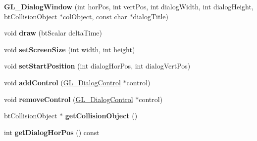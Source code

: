 \begin{DoxyCompactItemize}
\item 
\hypertarget{class_g_l___dialog_window_a64faa63c4e3878d581ee4775b4d77c94}{{\bfseries G\+L\+\_\+\+Dialog\+Window} (int hor\+Pos, int vert\+Pos, int dialog\+Width, int dialog\+Height, bt\+Collision\+Object $\ast$col\+Object, const char $\ast$dialog\+Title)}\label{class_g_l___dialog_window_a64faa63c4e3878d581ee4775b4d77c94}

\item 
\hypertarget{class_g_l___dialog_window_a722f7f10077f6f02a87765b60ad4a4a1}{void {\bfseries draw} (bt\+Scalar delta\+Time)}\label{class_g_l___dialog_window_a722f7f10077f6f02a87765b60ad4a4a1}

\item 
\hypertarget{class_g_l___dialog_window_a9a76a8a8ee77f3fdc2ca3560730343ca}{void {\bfseries set\+Screen\+Size} (int width, int height)}\label{class_g_l___dialog_window_a9a76a8a8ee77f3fdc2ca3560730343ca}

\item 
\hypertarget{class_g_l___dialog_window_a895c19ea0d50adb82368c2abcd5f6cfb}{void {\bfseries set\+Start\+Position} (int dialog\+Hor\+Pos, int dialog\+Vert\+Pos)}\label{class_g_l___dialog_window_a895c19ea0d50adb82368c2abcd5f6cfb}

\item 
\hypertarget{class_g_l___dialog_window_a56c26f294d68b3a7ad82beb52a74a765}{void {\bfseries add\+Control} (\hyperlink{class_g_l___dialog_control}{G\+L\+\_\+\+Dialog\+Control} $\ast$control)}\label{class_g_l___dialog_window_a56c26f294d68b3a7ad82beb52a74a765}

\item 
\hypertarget{class_g_l___dialog_window_a6cbdb5a13d8999c79976c7947b863e96}{void {\bfseries remove\+Control} (\hyperlink{class_g_l___dialog_control}{G\+L\+\_\+\+Dialog\+Control} $\ast$control)}\label{class_g_l___dialog_window_a6cbdb5a13d8999c79976c7947b863e96}

\item 
\hypertarget{class_g_l___dialog_window_a13d38c54d5eaa9ad958582b6b385c222}{bt\+Collision\+Object $\ast$ {\bfseries get\+Collision\+Object} ()}\label{class_g_l___dialog_window_a13d38c54d5eaa9ad958582b6b385c222}

\item 
\hypertarget{class_g_l___dialog_window_a9bd77630343068e56e012d93a1f86bba}{int {\bfseries get\+Dialog\+Hor\+Pos} () const }\label{class_g_l___dialog_window_a9bd77630343068e56e012d93a1f86bba}


\end{DoxyCompactItemize}
